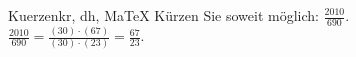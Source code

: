 \begin{MAufgabe}{Kuerzen}{kr, dh, MaTeX}
K\"urzen Sie soweit m\"oglich: $\frac{2010}{690}$.\\ 
\ifLsg\MLoesung
\quad $\frac{2010}{690}=\frac{(30)\cdot(67)}{(30)\cdot(23)}=\frac{67}{23}$.\else\relax\fi
 \end{MAufgabe}